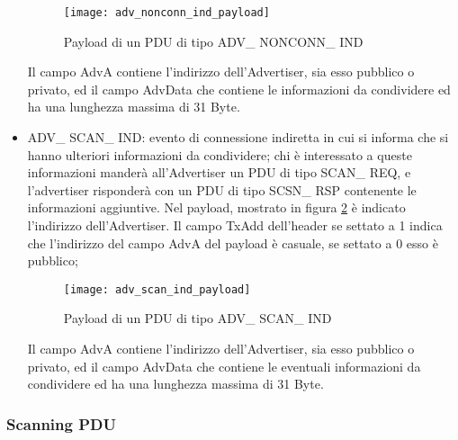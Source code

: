 \begin{itemize}
\begin{figure}[H]
\texttt{[image: adv\_nonconn\_ind\_payload]}
\centering
\caption{Payload di un PDU di tipo ADV\_ NONCONN\_ IND }
\label{adv_nonconn_ind_payload}
\end{figure}

Il campo AdvA contiene l'indirizzo dell'Advertiser, sia esso pubblico o privato, ed il campo AdvData che contiene le informazioni da condividere ed ha una lunghezza massima di 31 Byte.

\item ADV\_ SCAN\_ IND: evento di connessione indiretta in cui si informa che si hanno ulteriori informazioni da condividere; chi è interessato a queste informazioni manderà all'Advertiser un PDU di tipo SCAN\_ REQ, e l'advertiser risponderà con un PDU di tipo SCSN\_ RSP contenente le informazioni aggiuntive. Nel  payload, mostrato in figura \ref{adv_scan_ind_payload} è indicato l'indirizzo dell'Advertiser. Il campo TxAdd dell'header se settato a 1 indica che l'indirizzo del campo AdvA del payload è casuale, se settato a 0 esso è pubblico;

\begin{figure}[H]
\texttt{[image: adv\_scan\_ind\_payload]}
\centering
\caption{Payload di un PDU di tipo ADV\_ SCAN\_ IND }
\label{adv_scan_ind_payload}
\end{figure}

Il campo AdvA contiene l'indirizzo dell'Advertiser, sia esso pubblico o privato, ed il campo AdvData che contiene le eventuali informazioni da condividere ed ha una lunghezza massima di 31 Byte.

\end{itemize}

\subsubsection{Scanning PDU}

